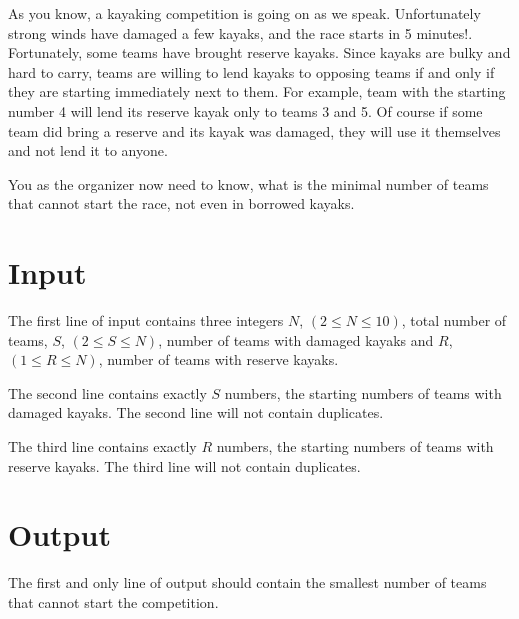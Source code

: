 
As you know, a kayaking competition is going on as we speak. Unfortunately strong winds have damaged
a few kayaks, and the race starts in 5 minutes!. Fortunately, some teams have brought reserve
kayaks. Since kayaks are bulky and hard to carry, teams are willing to lend kayaks to opposing teams
if and only if they are starting immediately next to them. For example, team with the starting
number 4 will lend its reserve kayak only to teams 3 and 5. Of course if some team did bring a
reserve and its kayak was damaged, they will use it themselves and not lend it to anyone.

You as the organizer now need to know, what is the minimal number of teams that cannot start the
race, not even in borrowed kayaks.

\section*{Input}
The first line of input contains three integers $N$, $(2 \le N \le 10)$, total number of teams, $S$,
$(2 \le S \le N)$, number of teams with damaged kayaks and $R$, $(1 \le R \le N)$, number of teams with
reserve kayaks.

The second line contains exactly $S$ numbers, the starting numbers of teams with damaged kayaks. The
second line will not contain duplicates.

The third line contains exactly $R$ numbers, the starting numbers of teams with reserve kayaks. The
third line will not contain duplicates.

\section*{Output}
The first and only line of output should contain the smallest number of teams that cannot start the
competition.
